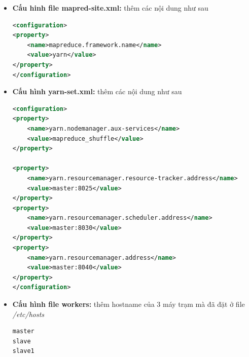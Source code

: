 \begin{enumerate}
\begin{itemize}
				\item \textbf{Cấu hinh file mapred-site.xml: }thêm các nội dung như sau
				\begin{lstlisting}[language=XML]
<configuration>
<property>
	<name>mapreduce.framework.name</name>
	<value>yarn</value>
</property>
</configuration>
				\end{lstlisting}
				\item \textbf{Cấu hình yarn-set.xml: }thêm các nội dung như sau
				\begin{lstlisting}[language=XML]
<configuration>
<property>
	<name>yarn.nodemanager.aux-services</name>
	<value>mapreduce_shuffle</value>
</property>

<property>
	<name>yarn.resourcemanager.resource-tracker.address</name>
	<value>master:8025</value>
</property>
<property>
	<name>yarn.resourcemanager.scheduler.address</name>
	<value>master:8030</value>
</property>
<property>
	<name>yarn.resourcemanager.address</name>
	<value>master:8040</value>
</property>
</configuration>
				\end{lstlisting}
				\item \textbf{Cấu hình file workers: }thêm hostname của 3 máy trạm mà đã đặt ở file \textit{/etc/hosts}
				\begin{lstlisting}
master
slave
slave1
				\end{lstlisting}
			\end{itemize}
			
			
			
		\end{enumerate}
		
